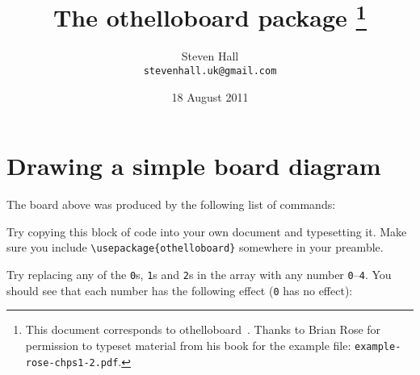 \documentclass[a4paper,12pt]{article}
\title{The \textsf{othelloboard} package%
\thanks{This document corresponds to \textsf{othelloboard}~\fileversion. Thanks to Brian Rose for permission to typeset material from his book for the example file: \texttt{example-rose-chps1-2.pdf}.}
}\author{Steven Hall \\ \texttt{stevenhall.uk@gmail.com}}
\date{18 August 2011}
\begin{document}
\pagestyle{plain}

\maketitle
\tableofcontents

\section{Drawing a simple board diagram}
\begin{center}
\begin{othelloboard}{1}
\gridrefs
\dotmarkings
{}
\end{othelloboard}
\end{center}

The board above was produced by the following list of commands:
	\begin{verbatimtab}
	\begin{othelloboard}{1}				
	\dotmarkings
	\end{othelloboard}
\end{verbatimtab}

Try copying this block of code into your own document and typesetting it. Make sure you include \verb=\usepackage{othelloboard}= somewhere in your preamble.

Try replacing any of the \verb=0=s, \verb=1=s and \verb=2=s in the array with any number \verb=0=--\verb=4=. You should see that each number has the following effect (\verb=0= has no effect):
\end{document}
